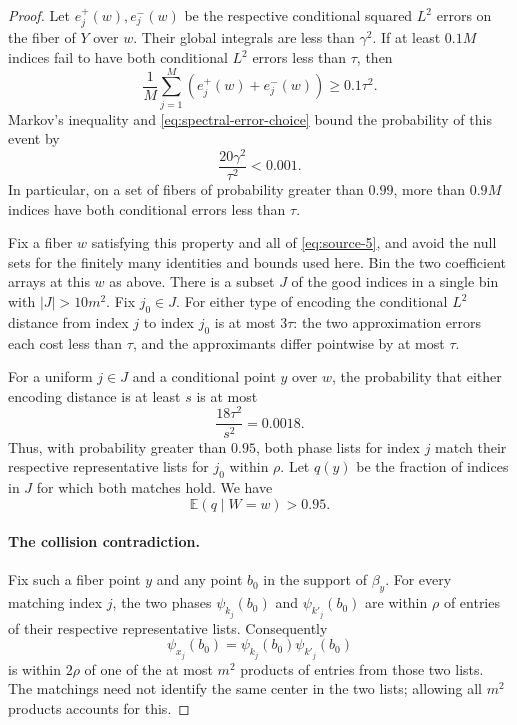 \begin{proof}
Let $e_j^+(w),e_j^-(w)$ be the respective conditional squared
$L^2$ errors on the fiber of $Y$ over $w$. Their global integrals
are less than $\gamma^2$. If at least $0.1M$ indices fail to have
both conditional $L^2$ errors less than $\tau$, then
\[
 \frac1M\sum_{j=1}^M(e_j^+(w)+e_j^-(w))\ge0.1\tau^2.
\]
Markov's inequality and \eqref{eq:spectral-error-choice} bound the
probability of this event by
\[
 \frac{20\gamma^2}{\tau^2}<0.001.
\]
In particular, on a set of fibers of probability greater than $0.99$,
more than $0.9M$ indices have both conditional errors less than $\tau$.

Fix a fiber $w$ satisfying this property and all of
\eqref{eq:source-5}, and avoid the null sets for the finitely many
identities and bounds used here. Bin the two coefficient arrays at
this $w$ as above. There is a subset $J$ of the good indices in a
single bin with $|J|>10m^2$. Fix $j_0\in J$. For either type of
encoding the conditional $L^2$ distance from index $j$ to index $j_0$
is at most $3\tau$: the two approximation errors each cost less than
$\tau$, and the approximants differ pointwise by at most $\tau$.

For a uniform $j\in J$ and a conditional point $y$ over $w$, the
probability that either encoding distance is at least $s$ is at most
\[
 \frac{18\tau^2}{s^2}=0.0018.
\]
Thus, with probability greater than $0.95$, both phase lists for
index $j$ match their respective representative lists for $j_0$
within $\rho$. Let $q(y)$ be the fraction of indices in $J$ for
which both matches hold. We have
\begin{equation}\label{eq:spectral-matching-fraction}
 \mathbb E(q\mid W=w)>0.95.
\end{equation}

\paragraph{The collision contradiction.}
Fix such a fiber point $y$ and any point $b_0$ in the support of
$\beta_y$. For every matching index $j$, the two phases
$\psi_{k_j}(b_0)$ and $\psi_{k'_j}(b_0)$ are within $\rho$ of entries
of their respective representative lists. Consequently
\[
 \psi_{x_j}(b_0)=\psi_{k_j}(b_0)\psi_{k'_j}(b_0)
\]
is within $2\rho$ of one of the at most $m^2$ products of entries
from those two lists. The matchings need not identify the same center
in the two lists; allowing all $m^2$ products accounts for this.


\end{proof}
